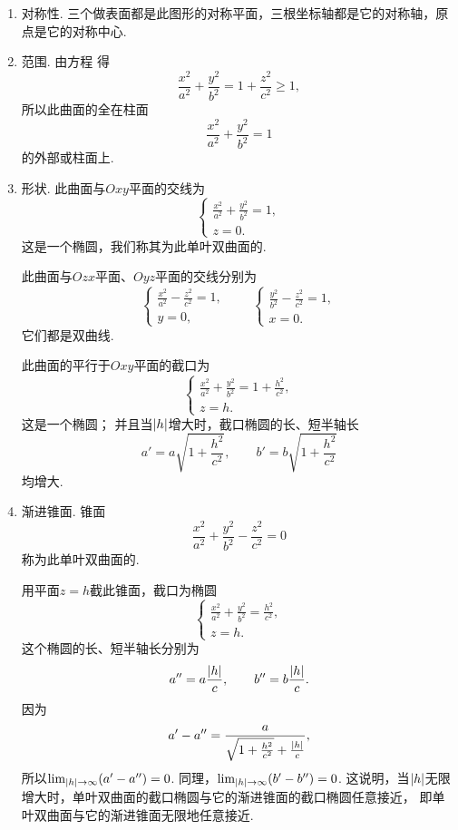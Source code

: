 \begin{enumerate}
	\item 对称性.
	三个做表面都是此图形的对称平面，三根坐标轴都是它的对称轴，原点是它的对称中心.

	\item 范围.
	由方程  得\[
		\frac{x^2}{a^2}+\frac{y^2}{b^2}=1+\frac{z^2}{c^2}\geq1,
	\]
	所以此曲面的全在柱面\[
		\frac{x^2}{a^2}+\frac{y^2}{b^2}=1
	\]的外部或柱面上.

	\item 形状.
	此曲面与\(Oxy\)平面的交线为\[
		\left\{ \begin{array}{l}
			\frac{x^2}{a^2}+\frac{y^2}{b^2}=1, \\
			z = 0.
		\end{array} \right.
	\]
	这是一个椭圆，我们称其为此单叶双曲面的.

	此曲面与\(Ozx\)平面、\(Oyz\)平面的交线分别为\[
		\left\{ \begin{array}{l}
			\frac{x^2}{a^2}-\frac{z^2}{c^2}=1, \\
			y = 0,
		\end{array} \right.
		\qquad
		\left\{ \begin{array}{l}
			\frac{y^2}{b^2}-\frac{z^2}{c^2}=1, \\
			x = 0.
		\end{array} \right.
	\]
	它们都是双曲线.

	此曲面的平行于\(Oxy\)平面的截口为\[
		\left\{ \begin{array}{l}
			\frac{x^2}{a^2}+\frac{y^2}{b^2}=1+\frac{h^2}{c^2}, \\
			z = h.
		\end{array} \right.
	\]
	这是一个椭圆；
	并且当\(\abs{h}\)增大时，截口椭圆的长、短半轴长\[
		a' = a \sqrt{1+\frac{h^2}{c^2}}, \qquad
		b' = b \sqrt{1+\frac{h^2}{c^2}}
	\]均增大.

	\item 渐进锥面.
	锥面\begin{equation}
		\frac{x^2}{a^2}+\frac{y^2}{b^2}-\frac{z^2}{c^2}=0
	\end{equation}
	称为此单叶双曲面的.

	用平面\(z=h\)截此锥面，截口为椭圆\[
		\left\{ \begin{array}{l}
			\frac{x^2}{a^2}+\frac{y^2}{b^2}=\frac{h^2}{c^2}, \\
			z = h.
		\end{array} \right.
	\]
	这个椭圆的长、短半轴长分别为\[
		a'' = a \frac{\abs{h}}{c}, \qquad
		b'' = b \frac{\abs{h}}{c}.
	\]
	因为\[
		a' - a'' = \frac{a}{\sqrt{1+\frac{h^2}{c^2}}+\frac{\abs{h}}{c}},
	\]
	所以\(\lim_{\abs{h}\to\infty}(a'-a'')=0\).
	同理，\(\lim_{\abs{h}\to\infty}(b'-b'')=0\).
	这说明，当\(\abs{h}\)无限增大时，单叶双曲面的截口椭圆与它的渐进锥面的截口椭圆任意接近，
	即单叶双曲面与它的渐进锥面无限地任意接近.
\end{enumerate}

